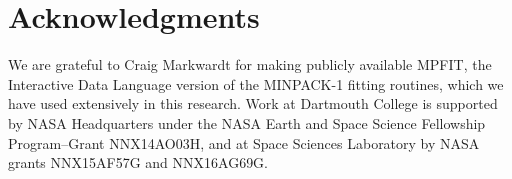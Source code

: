 

  
  \section*{Acknowledgments}

  We are grateful to Craig Markwardt for making publicly available MPFIT, the
  Interactive Data Language version of the MINPACK-1 fitting routines, which we
  have used extensively in this research. Work at Dartmouth College is supported
  by NASA Headquarters under the NASA Earth and Space Science Fellowship
  Program--Grant NNX14AO03H, and at Space Sciences Laboratory by NASA grants
  NNX15AF57G and NNX16AG69G.



